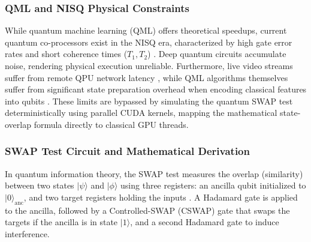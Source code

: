 \subsubsection{QML and NISQ Physical Constraints}
While quantum machine learning (QML) offers theoretical speedups, current quantum co-processors exist in the NISQ era, characterized by high gate error rates and short coherence times ($T_1, T_2$) \cite{bharti2022noisy, preskill2018quantum}. Deep quantum circuits accumulate noise, rendering physical execution unreliable. Furthermore, live video streams suffer from remote QPU network latency \cite{fraunhofer2025quantum}, while QML algorithms themselves suffer from significant state preparation overhead when encoding classical features into qubits \cite{kerenidis2019q}. These limits are bypassed by simulating the quantum SWAP test deterministically using parallel CUDA kernels, mapping the mathematical state-overlap formula directly to classical GPU threads.

\subsubsection{SWAP Test Circuit and Mathematical Derivation}
In quantum information theory, the SWAP test measures the overlap (similarity) between two states $\lvert\psi\rangle$ and $\lvert\phi\rangle$ using three registers: an ancilla qubit initialized to $\lvert 0 \rangle_{\text{anc}}$, and two target registers holding the inputs \cite{buhrman2001quantum}. A Hadamard gate is applied to the ancilla, followed by a Controlled-SWAP (CSWAP) gate that swaps the targets if the ancilla is in state $\lvert1\rangle$, and a second Hadamard gate to induce interference.

